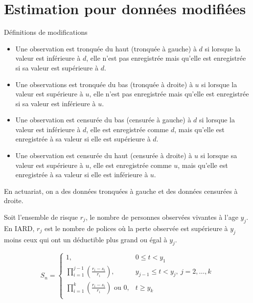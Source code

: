 \chapter{Estimation pour données modifiées}

\begin{definition}{Définitions de modifications}{}
	\begin{itemize}
		\item Une observation est tronquée du haut (tronquée à gauche) à $d$ si lorsque la valeur est inférieure à $d$, elle n'est pas enregistrée mais qu'elle est enregistrée si sa valeur est supérieure à $d$. 
		\item Une observations est tronquée du bas (tronquée à droite) à $u$ si lorsque la valeur est supérieure à $u$, elle n'est pas enregistrée mais qu'elle est enregistrée si sa valeur est inférieure à $u$. 
		\item Une observation est censurée du bas (censurée à gauche) à $d$ si lorsque la valeur est inférieure à $d$, elle est enregistrée comme $d$, mais qu'elle est enregistrée à sa valeur si elle est supérieure à $d$. 
		\item Une observation est censurée du haut (censurée à droite) à $u$ si lorsque sa valeur est supérieure à $u$, elle est enregistrée comme $u$, mais qu'elle est enregistrée à sa valeur si elle est inférieure à $u$. 
	\end{itemize}
\end{definition}

En actuariat, on a des données tronquées à gauche et des données censurées à droite. 

Soit l'ensemble de risque $r_j$, le nombre de personnes observées vivantes à l'age $y_j$. En IARD, $r_j$ est le nombre de polices où la perte observée est supérieure à $y_j$ moins ceux qui ont un déductible plus grand ou égal à $y_j$. 

$$S_n = \left\{  \begin{array}{ll}
	                                1,                                 &           0\leq t < y_1            \\ 
	     \prod_{i = 1}^{j-1} \left(\frac{r_i - s_i}{r_i}\right),       & y_{j-1}\leq t < y_j,~j=2, \dots, k \\ 
	\prod_{i = 1}^{k}\left(\frac{r_i - s_i}{r_i}\right) \text{ ou } 0, &             t\geq y_k              \\ 
\end{array}       \right.$$












